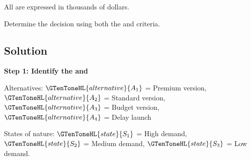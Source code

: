 	All  are expressed in thousands of dollars.
	
	Determine the decision using both the  and  criteria.
	
	
	\subsection{Solution}
	
	\textbf{Step 1: Identify the  and   }
	
	Alternatives: $\GTenToneHL{alternative}{A_1}$ = Premium version, $\GTenToneHL{alternative}{A_2}$ = Standard version,
	$\GTenToneHL{alternative}{A_3}$ = Budget version, $\GTenToneHL{alternative}{A_4}$ = Delay launch
	
	\qquad
	
	States of nature: $\GTenToneHL{state}{S_1}$ = High demand, $\GTenToneHL{state}{S_2}$ = Medium demand,
	$\GTenToneHL{state}{S_3}$ = Low demand.
	
	\noindent
	\setlength{\columnseprule}{0.4pt}
	
